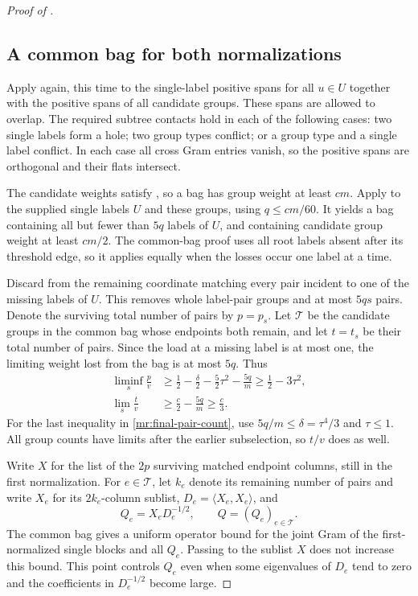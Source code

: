 \begin{proof}[Proof of ]
\subsection{A common bag for both normalizations}

Apply  again, this time to the single-label
positive spans for all $u\in U$ together with the positive spans of all
candidate groups.  These spans are allowed to overlap.  The required
subtree contacts hold in each of the following cases: two single labels
form a hole; two group types conflict; or a group type and a single
label conflict.  In each case all cross Gram entries vanish, so the
positive spans are orthogonal and their flats intersect.

The candidate weights satisfy , so a bag has
group weight at least $cm$.  Apply  to the supplied
single labels $U$ and these groups, using $q\le cm/60$.  It yields a
bag containing all but fewer than $5q$ labels of $U$, and containing
candidate group weight at least $cm/2$.  The common-bag proof uses all
root labels absent after its threshold edge, so it applies equally
when the losses occur one label at a time.

Discard from the remaining coordinate matching every pair incident to one of the
missing labels of $U$.  This removes whole label-pair groups and at most
$5qs$ pairs.  Denote the surviving total number of pairs by $p=p_s$.
Let $\mathcal T$ be the candidate groups in the common bag whose
endpoints both remain, and let $t=t_s$ be their total number of pairs.
Since the load at a missing label is at most one, the limiting weight
lost from the bag is at most $5q$.  Thus
\begin{align}
 \liminf_s\frac pv
 &\ge\frac12-\frac\delta2-\frac52\tau^2-\frac{5q}{m}
 \ge\frac12-3\tau^2,
       \label{mr:final-pair-count}\\
 \lim_s\frac tv
 &\ge\frac c2-\frac{5q}{m}\ge\frac c3.
       \label{mr:extra-pair-count}
\end{align}
For the last inequality in \eqref{mr:final-pair-count}, use
$5q/m\le\delta=\tau^4/3$ and $\tau\le1$.  All group counts have
limits after the earlier subselection, so $t/v$ does as well.

Write $X$ for the list of the $2p$ surviving matched endpoint columns,
still in the first normalization. For $e\in\mathcal T$, let $k_e$
denote its remaining number of pairs and write $X_e$ for its
$2k_e$-column sublist, $D_e=\langle X_e,X_e\rangle$, and
\begin{equation}\label{mr:second-normalization}
 Q_e=X_eD_e^{-1/2},
 \qquad Q=(Q_e)_{e\in\mathcal T}.
\end{equation}
The common bag gives a uniform operator bound for the joint Gram of
the first-normalized single blocks and all $Q_e$.  Passing to the
sublist $X$ does not increase this bound.  This point controls $Q_e$
even when some eigenvalues of $D_e$ tend to zero and the coefficients
in $D_e^{-1/2}$ become large.


\end{proof}
